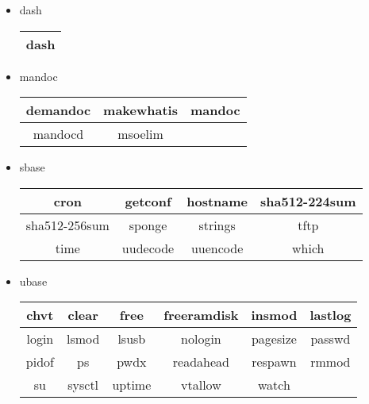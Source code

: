 \begin{itemize}
    \item dash
        \begin{center}
            \begin{tabular}{|c|}
                \hline
                dash \\
                \hline
            \end{tabular}
        \end{center}
    \item mandoc
        \begin{center}
            \begin{tabular}{|c|c|c|}
                \hline
                demandoc & makewhatis & mandoc \\
                \hline
                mandocd & msoelim \\
                \cline{1-2}
            \end{tabular}
        \end{center}
    \item sbase
        \begin{center}
            \begin{tabular}{|c|c|c|c|}
                \hline
                cron & getconf & hostname & sha512-224sum \\
                \hline
                sha512-256sum & sponge & strings & tftp \\
                \hline
                time & uudecode & uuencode & which \\
                \hline
            \end{tabular}
        \end{center}
    \item ubase
        \begin{center}
            \begin{tabular}{|c|c|c|c|c|c|}
                \hline
                chvt & clear & free & freeramdisk & insmod & lastlog \\
                \hline
                login & lsmod & lsusb & nologin & pagesize & passwd \\
                \hline
                pidof & ps & pwdx & readahead & respawn & rmmod \\
                \hline
                su & sysctl & uptime & vtallow & watch \\
                \cline{1-5}
            \end{tabular}
        \end{center}
\end{itemize}

